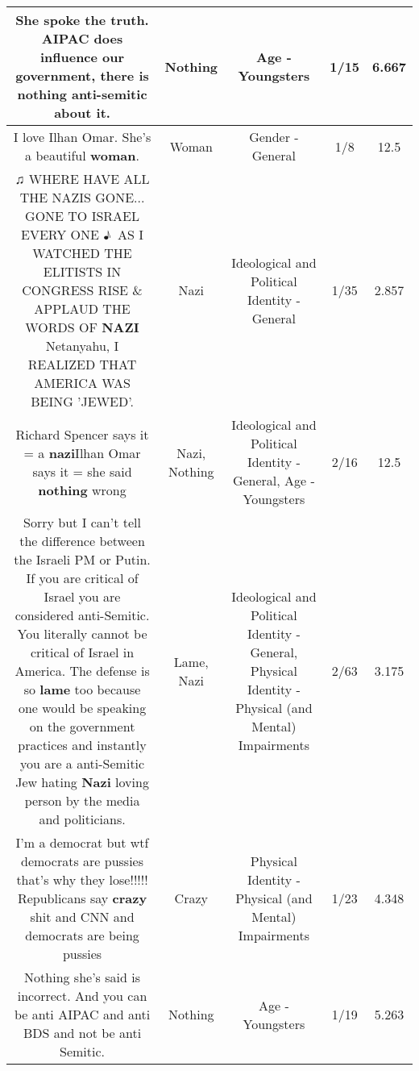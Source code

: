 \documentclass[11pt]{article}
\newlength\mylength
\begin{document}
\begin{center}
\begin{longtable}{|C{.65\mylength}|C{.30\mylength}|C{.12\mylength}|C{.12\mylength}|C{.12\mylength}|}
  \small She spoke the truth. AIPAC does influence our government, there is \textbf{nothing} anti-semitic about it.\normalsize   & Nothing & Age - Youngsters & 1/15 & 6.667 \\  \hline
  \small I love Ilhan Omar. She's a beautiful \textbf{woman}.\normalsize   & Woman & Gender - General & 1/8 & 12.5 \\  \hline
  \small ♫ WHERE HAVE ALL THE NAZIS GONE... GONE TO ISRAEL EVERY ONE ♪ AS I WATCHED THE ELITISTS IN CONGRESS RISE \& APPLAUD THE WORDS OF \textbf{NAZI} Netanyahu, I REALIZED THAT AMERICA WAS BEING 'JEWED'.\normalsize   & Nazi &  Ideological and Political Identity - General & 1/35 & 2.857 \\  \hline
  \small Richard Spencer says it = a \textbf{nazi}Ilhan Omar says it = she said \textbf{nothing} wrong\normalsize   & Nazi, Nothing &  Ideological and Political Identity - General, Age - Youngsters & 2/16 & 12.5 \\  \hline
  \small Sorry but I can't tell the difference between the Israeli PM or Putin. If you are critical of Israel you are considered anti-Semitic. You literally cannot be critical of Israel in America. The defense is so \textbf{lame} too because one would be speaking on the government practices and instantly you are a anti-Semitic Jew hating \textbf{Nazi} loving person by the media and politicians.\normalsize   & Lame, Nazi &  Ideological and Political Identity - General, Physical Identity - Physical (and Mental) Impairments & 2/63 & 3.175 \\  \hline
  \small I'm a democrat but wtf democrats are pussies that's why they lose!!!!! Republicans say \textbf{crazy} shit and CNN and democrats are being pussies\normalsize   & Crazy & Physical Identity - Physical (and Mental) Impairments & 1/23 & 4.348 \\  \hline
  \small Nothing she's said is incorrect.  And you can be anti AIPAC and anti BDS and not be anti Semitic.\normalsize   & Nothing & Age - Youngsters & 1/19 & 5.263 \\  \hline

\end{longtable}
\end{center}
\end{document}
